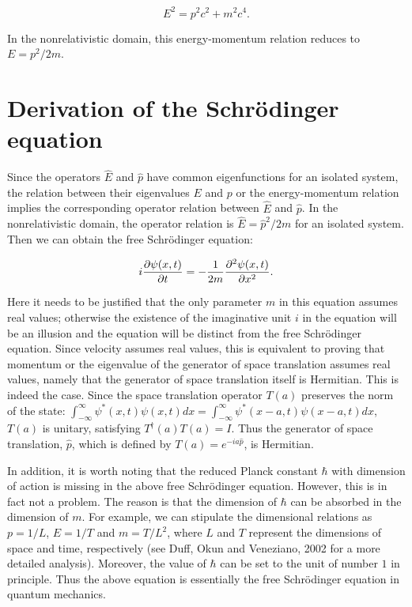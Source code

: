 \begin{equation}
E^2=p^2c^2+m^2 c^4.
\label{EM2}
\end{equation}

\noindent In the nonrelativistic domain, this energy-momentum relation reduces to $E=p^2/2m$.

\section{Derivation of the Schr\"{o}dinger equation}

Since the operators $\hat{E}$ and $\hat{p}$ have common eigenfunctions for an isolated system, the relation between their eigenvalues $E$ and  $p$ or the energy-momentum relation implies the corresponding operator relation between $\hat{E}$ and $\hat{p}$. In the nonrelativistic domain, the operator relation is $\hat{E}=\hat{p}^2/2m$ for an isolated system. Then we can obtain the free Schr\"{o}dinger equation:

\begin{equation}
i{\partial \psi(x,t) \over \partial t}=-{1 \over 2m}{{\partial^2 \psi(x,t)}\over \partial x^2}.
\label{FSch}
\end{equation}

Here it needs to be justified that the only parameter $m$ in this equation assumes real values; otherwise the existence of the imaginative unit $i$ in the equation will be an illusion and the equation will be distinct from the free Schr\"{o}dinger equation. Since velocity assumes real values, this is equivalent to proving that momentum or the eigenvalue of the generator of space translation assumes real values, namely that the generator of space translation itself is Hermitian. This is indeed the case. Since the space translation operator $T(a)$ preserves the norm of the state: $\int_{-\infty}^{\infty} \psi^{\ast}(x,t)\psi(x,t)dx=\int_{-\infty}^{\infty} \psi^{\ast}(x-a,t)\psi(x-a,t)dx$, $T(a)$ is unitary, satisfying $T^{\dagger}(a)T(a)=I$. Thus the generator of space translation, $\hat{p}$, which is defined by $T(a)=e^{-ia\hat{p}}$, is Hermitian. 

In addition, it is worth noting that the reduced Planck constant $\hbar$ with dimension of action is missing in the above free Schr\"{o}dinger equation. However, this is in fact not a problem. The reason is that the dimension of $\hbar$ can be absorbed in the dimension of $m$. For example, we can stipulate the dimensional relations as $p=1/L$, $E=1/T$ and $m=T/L^2$, where $L$ and $T$ represent the dimensions of space and time, respectively (see Duff, Okun and Veneziano, 2002 for a more detailed analysis). Moreover, the value of $\hbar$ can be set to the unit of number $1$ in principle. Thus the above equation is essentially the free Schr\"{o}dinger equation in quantum mechanics.

